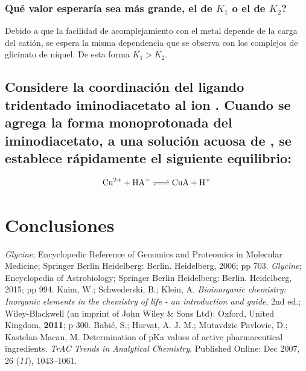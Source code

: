 \documentclass[fleqn,10pt]{SelfArx} %
\begin{document}
	\subsubsection{Qu\'e valor esperar\'ia sea m\'as grande, el de $K_1$ o el de $K_2$?}
	Debido a que la facilidad de acomplejamiento con el metal depende de la carga del cati\'on, se espera la misma dependencia que se observa con los complejos de glicinato de n\'iquel. De esta forma $K_1 > K_2$.
	
	\subsection{Considere la coordinaci\'on del ligando tridentado iminodiacetato al ion . Cuando se agrega la forma monoprotonada del iminodiacetato, a una soluci\'on acuosa de , se establece r\'apidamente el siguiente equilibrio:}
	\begin{equation}
	\ce{Cu^{2+} + HA- <=> CuA + H+}
	\end{equation}
	
	\section{Conclusiones}
	
	
	\begin{thebibliography}{9}
		\textit{Glycine}; Encyclopedic Reference of Genomics and Proteomics in Molecular Medicine; Springer Berlin Heidelberg: Berlin. Heidelberg, 2006; pp 703.
		\textit{Glycine}; Encyclopedia of Astrobiology; Springer Berlin Heidelberg: Berlin. Heidelberg, 2015; pp 994.
		Kaim, W.; Schwederski, B.; Klein, A. \textit{Bioinorganic chemistry: Inorganic elements in the chemistry of life - an introduction and guide}, 2nd ed.; Wiley-Blackwell (an imprint of John Wiley \& Sons Ltd): Oxford, United Kingdom, \textbf{2011}; p 300.
		Babi\'c, S.; Horvat, A. J. M.; Mutavdzic Pavlovic, D.; Kastelan-Macan, M. Determination of pKa values of active pharmaceutical ingredients. \textit{TrAC Trends in Analytical Chemistry}. Published Online: Dec 2007, 26 (\textit{11}), 1043–1061.
	\end{thebibliography}
\end{document}
